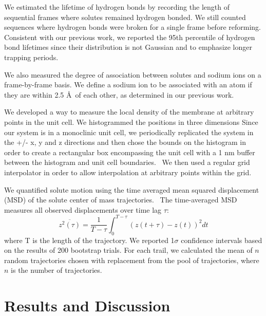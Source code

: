 \documentclass[journal=jpcbfk,manuscript=article]{achemso}
\begin{document}
  We estimated the lifetime of hydrogen bonds by recording the length of 
  sequential frames where solutes remained hydrogen bonded. We still counted sequences
  where hydrogen bonds were broken for a single frame before reforming. Consistent
  with our previous work, we reported the 95th percentile of hydrogen bond lifetimes
  since their distribution is not Gaussian and to emphasize longer trapping periods.~\cite{coscia_chemically_2019}
  
  We also measured the degree of association between solutes and sodium ions on a
  frame-by-frame basis. We define a sodium ion to be associated with an atom if they
  are within 2.5 \AA~of each other, as determined in our previous work.~\cite{coscia_chemically_2019}
  
  We developed a way to measure the local density of the membrane at arbitrary
  points in the unit cell. We histogrammed the positions in three dimensions
  Since our system is in a monoclinic unit cell, we periodically replicated
  the system in the +/- x, y and z directions and then chose the bounds on the
  histogram in order to create a rectangular box encompassing the unit cell with
  a 1 nm buffer between the histogram and unit cell boundaries.~\cite{van_der_walt_numpy_2011} We then used a regular
  grid interpolator in order to allow interpolation at arbitrary points within the grid.~\cite{virtanen_scipy_2020} 
  
  We quantified solute motion using the time averaged mean squared displacement (MSD)
  of the solute center of mass trajectories.~\cite{meroz_toolbox_2015} The time-averaged MSD measures all observed
  displacements over time lag $\tau$:
  \begin{equation}
  	\overline{z^2(\tau)} = \dfrac{1}{T - \tau}\int_{0}^{T - \tau} (z(t + \tau) - z(t))^2 dt
  \label{eqn:tamsd}
  \end{equation}
  where T is the length of the trajectory. We reported 1$\sigma$ confidence intervals 
  based on the results of 200 bootstrap trials. For each trail, we calculated the mean of 
  $n$ random trajectories chosen with replacement from the pool of trajectories, where 
  $n$ is the number of trajectories.

  \section{Results and Discussion}
  
  
\end{document}
